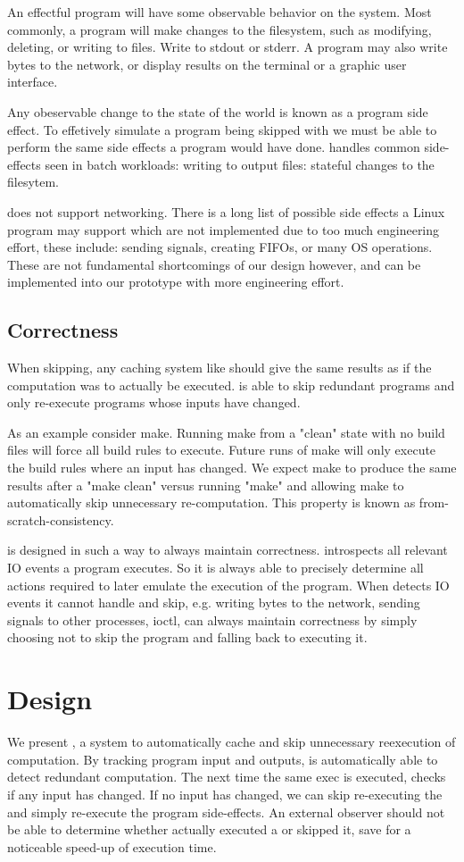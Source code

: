 An effectful program will have some observable behavior on the system. Most commonly, a program will make
changes to the filesystem, such as modifying, deleting, or writing to files. Write to stdout or stderr.
A program may also write bytes to the network, or display results on the terminal or a graphic user
interface.

Any obeservable change to the state of the world is known as a program side effect. To effetively simulate
a program being skipped with \pc we must be able to perform the same side effects a program would have done. \pc handles common side-effects seen in batch workloads: writing to output files: stateful changes
to the filesytem.

\pc does not support networking. There is a long list of possible side effects a Linux program may
support which are not implemented due to too much engineering effort, these include: sending signals,
creating FIFOs, or many OS operations. These are not fundamental shortcomings of our design however, and can be implemented into our prototype with more engineering effort.

\subsection{Correctness}
When skipping, any caching system like \pc should give the same results as if the computation was to actually be executed. \pc is able to skip redundant programs and only re-execute programs whose inputs have changed.

As an example consider make. Running make from a "clean" state with no build files will force all build
rules to execute. Future runs of make will only execute the build rules where an input has changed. We expect make to produce the same results after a "make clean" versus running "make" and allowing make to automatically skip unnecessary re-computation. This property is known as from-scratch-consistency.

\pc is designed in such a way to always maintain correctness. \pc introspects all relevant IO
events a program executes. So it is always able to precisely determine all actions required to later
emulate the execution of the program. When \pc detects IO events it cannot handle and skip, e.g. writing bytes to the network, sending signals to other processes, ioctl, \pc can always maintain correctness by simply choosing not to skip the program and falling back to executing it.

\section{\pc Design}
We present \pc, a system to automatically cache and skip unnecessary reexecution of computation. By tracking program input and outputs, \pc is automatically able to detect redundant computation. The next time the same exec is executed, \pc checks if any input has changed. If no input has changed, we can skip re-executing the \cacheunit{} and simply re-execute the program side-effects. An external observer should not be able to determine whether \pc actually executed a \cacheunit{} or skipped it, save for a noticeable speed-up of execution time.

